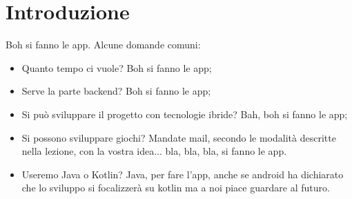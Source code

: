 \chapter{Introduzione}

Boh si fanno le app. Alcune domande comuni:
\begin{itemize}
	\item Quanto tempo ci vuole? Boh si fanno le app;
	\item Serve la parte backend? Boh si fanno le app;
	\item Si può sviluppare il progetto con tecnologie ibride? Bah, boh si fanno le app;
	\item Si possono sviluppare giochi? Mandate mail, secondo le modalità descritte nella lezione, con la vostra idea... bla, bla, bla, si fanno le app.
	\item Useremo Java o Kotlin? Java, per fare l'app, anche se android ha dichiarato che lo sviluppo si focalizzerà su kotlin ma a noi piace guardare al futuro.
\end{itemize}